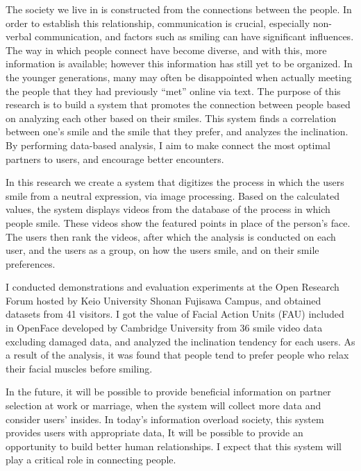 \begin{eabstract}


  The society we live in is constructed from the connections between the people.
  In order to establish this relationship, communication is crucial, especially non-verbal communication,
  and factors such as smiling can have significant influences.
  The way in which people connect have become diverse, and with this, more information is available;
  however this information has still yet to be organized.
  In the younger generations,
  many may often be disappointed when actually meeting the people that they had previously “met” online via text.
  The purpose of this research is to build a system that promotes the connection between people based on analyzing each other based on their smiles.
  This system finds a correlation between one’s smile and the smile that they prefer, and analyzes the inclination.
  By performing data-based analysis, I aim to make connect the most optimal partners to users, and encourage better encounters.

  In this research we create a system that digitizes the process in which the users smile from a neutral expression, via image processing.
  Based on the calculated values,
  the system displays videos from the database of the process in which people smile.
  These videos show the featured points in place of the person’s face.
  The users then rank the videos, after which the analysis is conducted on each user,
  and the users as a group, on how the users smile, and on their smile preferences.

  I conducted demonstrations and evaluation experiments at the Open Research Forum hosted by Keio University Shonan Fujisawa Campus,
  and obtained datasets from 41 visitors.
  I got the value of Facial Action Units (FAU) included in OpenFace developed by Cambridge University from 36 smile video data excluding damaged data,
  and analyzed the inclination tendency for each users.
  As a result of the analysis, it was found that people tend to prefer people who relax their facial muscles before smiling.

In the future,
it will be possible to provide beneficial information on partner selection at work or marriage,
when the system will collect more data and consider users' insides.
In today's information overload society, this system provides users with appropriate data,
It will be possible to provide an opportunity to build better human relationships.
I expect that this system will play a critical role in connecting people.

\end{eabstract}

